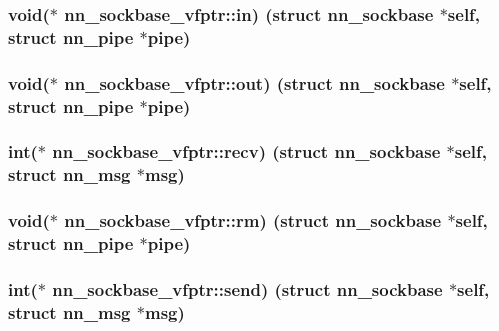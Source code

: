 \subsubsection[{in}]{\setlength{\rightskip}{0pt plus 5cm}void($\ast$ nn\+\_\+sockbase\+\_\+vfptr\+::in) (struct {\bf nn\+\_\+sockbase} $\ast$self, struct nn\+\_\+pipe $\ast$pipe)}\hypertarget{structnn__sockbase__vfptr_a7c415a0569349edaa9a871b6cf046981}{}\label{structnn__sockbase__vfptr_a7c415a0569349edaa9a871b6cf046981}
\subsubsection[{out}]{\setlength{\rightskip}{0pt plus 5cm}void($\ast$ nn\+\_\+sockbase\+\_\+vfptr\+::out) (struct {\bf nn\+\_\+sockbase} $\ast$self, struct nn\+\_\+pipe $\ast$pipe)}\hypertarget{structnn__sockbase__vfptr_a00462453b9943c58957d72dc1c81993e}{}\label{structnn__sockbase__vfptr_a00462453b9943c58957d72dc1c81993e}
\subsubsection[{recv}]{\setlength{\rightskip}{0pt plus 5cm}int($\ast$ nn\+\_\+sockbase\+\_\+vfptr\+::recv) (struct {\bf nn\+\_\+sockbase} $\ast$self, struct {\bf nn\+\_\+msg} $\ast$msg)}\hypertarget{structnn__sockbase__vfptr_aa62b42312d6a67f46d14be1091bc7b6e}{}\label{structnn__sockbase__vfptr_aa62b42312d6a67f46d14be1091bc7b6e}
\subsubsection[{rm}]{\setlength{\rightskip}{0pt plus 5cm}void($\ast$ nn\+\_\+sockbase\+\_\+vfptr\+::rm) (struct {\bf nn\+\_\+sockbase} $\ast$self, struct nn\+\_\+pipe $\ast$pipe)}\hypertarget{structnn__sockbase__vfptr_a87bbdf36e121f7b43fd33469136f4120}{}\label{structnn__sockbase__vfptr_a87bbdf36e121f7b43fd33469136f4120}
\subsubsection[{send}]{\setlength{\rightskip}{0pt plus 5cm}int($\ast$ nn\+\_\+sockbase\+\_\+vfptr\+::send) (struct {\bf nn\+\_\+sockbase} $\ast$self, struct {\bf nn\+\_\+msg} $\ast$msg)}\hypertarget{structnn__sockbase__vfptr_aec14503d16acd7d2da2a6b4e510c0e4d}{}\label{structnn__sockbase__vfptr_aec14503d16acd7d2da2a6b4e510c0e4d}
